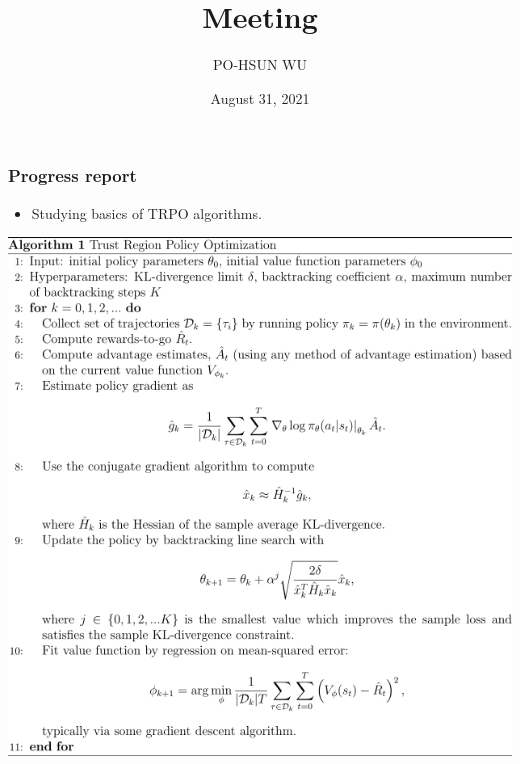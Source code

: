 \documentclass{beamer}
\date{August 31, 2021}
\title{Meeting}
\author{PO-HSUN WU}
\begin{document}
    \frame{\titlepage}

    \begin{frame}
        \frametitle{Progress report}
        \begin{itemize}
            \item Studying basics of TRPO algorithms.
        \end{itemize}
        \centering
        \includegraphics[scale=.3]{TRPO_code.jpg}
    \end{frame}
\end{document}
